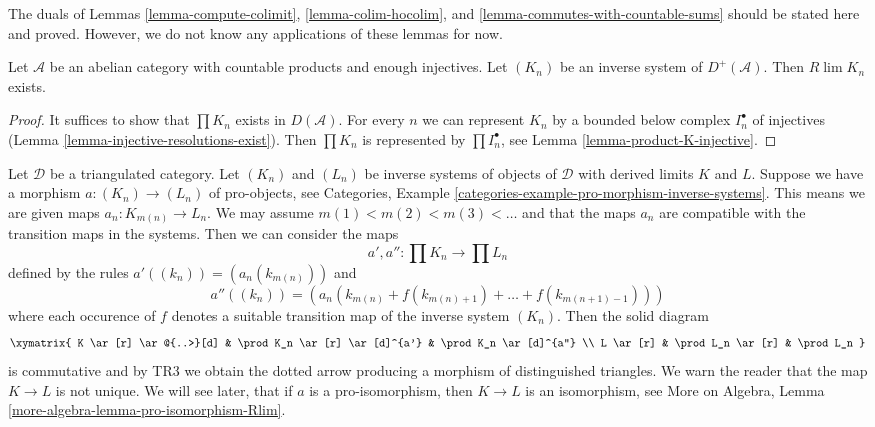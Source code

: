 \noindent
The duals of Lemmas \ref{lemma-compute-colimit},
\ref{lemma-colim-hocolim}, and
\ref{lemma-commutes-with-countable-sums}
should be stated here and proved. However, we do not know any applications
of these lemmas for now.

\begin{lemma}
\label{lemma-inverse-limit-bounded-below}
Let $\mathcal{A}$ be an abelian category with countable products and
enough injectives. Let $(K_n)$ be an inverse system of $D^+(\mathcal{A})$.
Then $R\lim K_n$ exists.
\end{lemma}

\begin{proof}
It suffices to show that $\prod K_n$ exists in $D(\mathcal{A})$.
For every $n$ we can represent $K_n$ by a bounded below complex
$I_n^\bullet$ of injectives (Lemma \ref{lemma-injective-resolutions-exist}).
Then $\prod K_n$ is represented by $\prod I_n^\bullet$, see
Lemma \ref{lemma-product-K-injective}.
\end{proof}

\begin{remark}
\label{remark-functoriality-derived-limit}
Let $\mathcal{D}$ be a triangulated category. Let $(K_n)$ and $(L_n)$ be
inverse systems of objects of $\mathcal{D}$ with derived limits $K$ and $L$.
Suppose we have a morphism $a : (K_n) \to (L_n)$ of pro-objects, see
Categories, Example \ref{categories-example-pro-morphism-inverse-systems}.
This means we are given maps $a_n : K_{m(n)} \to L_n$. We may assume
$m(1) < m(2) < m(3) < \ldots$ and that the maps $a_n$ are compatible
with the transition maps in the systems. Then we can consider the maps
$$
a', a'' : \prod K_n \longrightarrow \prod L_n
$$
defined by the rules $a'((k_n)) = (a_n(k_{m(n)}))$ and
$$
a''((k_n)) =
(a_n(k_{m(n)} + f(k_{m(n) + 1}) + \ldots + f(k_{m(n + 1) - 1})))
$$
where each occurence of $f$ denotes a suitable transition map of
the inverse system $(K_n)$. Then the solid diagram
$$
\xymatrix{
K \ar[r] \ar@{..>}[d] & \prod K_n \ar[r] \ar[d]^{a'} &
\prod K_n \ar[d]^{a''} \\
L \ar[r] & \prod L_n \ar[r] & \prod L_n
}
$$
is commutative and by TR3 we obtain the dotted arrow producing
a morphism of distinguished triangles. We warn the reader that
the map $K \to L$ is not unique. We will see later, that if $a$
is a pro-isomorphism, then $K \to L$ is an isomorphism, see
More on Algebra, Lemma \ref{more-algebra-lemma-pro-isomorphism-Rlim}.
\end{remark}

